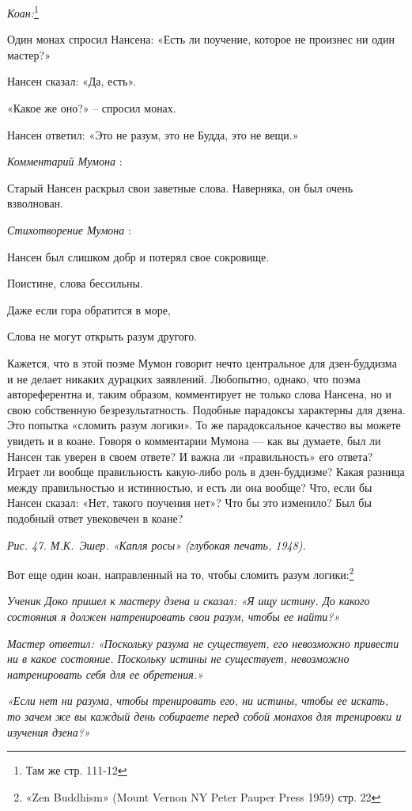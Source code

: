 \documentclass[../main.tex]{subfiles}
\begin{document}
\emph{Коан:}\footnote{Там же стр. 111-12}

Один монах спросил Нансена: «Есть ли поучение, которое не произнес ни один мастер?»

Нансен сказал: «Да, есть».

«Какое же оно?» \--- спросил монах.

Нансен ответил: «Это не разум, это не Будда, это не вещи.»

\emph{Комментарий Мумона} :

Старый Нансен раскрыл свои заветные слова. Наверняка, он был очень взволнован.

\emph{Стихотворение Мумона} :

Нансен был слишком добр и потерял свое сокровище.

Поистине, слова бессильны.

Даже если гора обратится в море,

Слова не могут открыть разум другого.

Кажется, что в этой поэме Мумон говорит нечто центральное для дзен-буддизма и не делает никаких дурацких заявлений. Любопытно, однако, что поэма автореферентна и, таким образом, комментирует не только слова Нансена, но и свою собственную безрезультатность. Подобные парадоксы характерны для дзена. Это попытка «сломить разум логики». То же парадоксальное качество вы можете увидеть и в коане. Говоря о комментарии Мумона --- как вы думаете, был ли Нансен так уверен в своем ответе? И важна ли «правильность» его ответа? Играет ли вообще правильность какую-либо роль в дзен-буддизме? Какая разница между правильностью и истинностью, и есть ли она вообще? Что, если бы Нансен сказал: «Нет, такого поучения нет»? Что бы это изменило? Был бы подобный ответ увековечен в коане?

\emph{Рис. 47. М.К.~Эшер. «Капля росы» (глубокая печать, 1948).}

Вот еще один коан, направленный на то, чтобы сломить разум логики:\footnote{«Zen Buddhism» (Mount Vernon NY Peter Pauper Press 1959) стр. 22}

\emph{Ученик Доко пришел к мастеру дзена и сказал: «Я ищу истину. До какого состояния я должен натренировать свои разум, чтобы ее найти?»}

\emph{Мастер ответил: «Поскольку разума не существует, его невозможно привести ни в какое состояние. Поскольку истины не существует, невозможно натренировать себя для ее обретения.»}

\emph{«Если нет ни разума, чтобы тренировать его, ни истины, чтобы ее искать, то зачем же вы каждый день собираете перед собой монахов для тренировки и изучения дзена?»}
\end{document}

